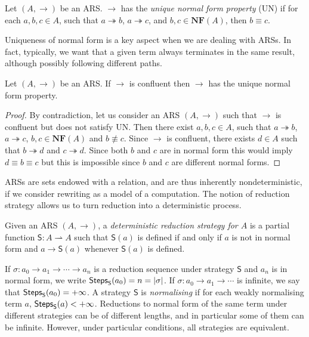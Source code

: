 \begin{definition}
	Let $(A,\rightarrow)$ be an ARS. $\rightarrow$ has the \emph{unique normal form property} (UN) if for each $a,b,c\in A$, such that $a\twoheadrightarrow b$, $a\twoheadrightarrow c$, and $b,c\in\mathbf{NF}(A)$, then $b\equiv c$.
\end{definition}
Uniqueness of normal form is a key aspect when we are dealing with ARSs. In fact, typically, we want that a given term always terminates in the same result, although possibly following different paths.
\begin{proposition}
	Let $(A,\rightarrow)$ be an ARS. If $\rightarrow$ is confluent then $\rightarrow$ has the unique normal form property.
\end{proposition}
\begin{proof}
	By contradiction, let us consider an ARS $(A,\rightarrow)$ such that $\rightarrow$ is confluent but does not satisfy UN. Then there exist $a,b,c\in A$, such that $a\twoheadrightarrow b$, $a\twoheadrightarrow c$, $b,c\in\mathbf{NF}(A)$ and $b\not\equiv c$. Since $\rightarrow$ is confluent, there exists $d\in A$ such that $b\twoheadrightarrow d$ and $c\twoheadrightarrow d$. Since both $b$ and $c$ are in normal form this would imply $d\equiv b\equiv c$ but this is impossible since $b$ and $c$ are different normal forms.
\end{proof}
ARSs are sets endowed with a relation, and are thus
inherently nondeterministic, if we consider rewriting as a model of a computation. The notion of reduction strategy allows us to turn reduction into a deterministic process.
\begin{definition}\label{def:determstrat}
	Given an ARS $(A,\rightarrow)$, a \emph{deterministic reduction
		strategy for $A$} is a partial function $\mathsf{S}:A\rightharpoonup A$
	such that $\mathsf{S}(a)$ is defined if and only if $a$ is not in
	normal form and $a\rightarrow\mathsf{S}(a)$ whenever $\mathsf{S}(a)$
	is defined.
\end{definition}
If $\sigma:a_0\rightarrow a_1\rightarrow\cdots\rightarrow a_n$ is a
reduction sequence under strategy $\mathsf{S}$ and $a_n$ is in normal
form, we write $\textsf{Steps}_{\mathsf{S}}(a_0)=n=|\sigma|$. If
$\sigma:a_0\rightarrow a_1\rightarrow\cdots$ is infinite, we say that
$\textsf{Steps}_{\mathsf{S}}(a_0)=+\infty$. A strategy $\mathsf{S}$ is \emph{normalising} if for each weakly normalising term $a$, $\textsf{Steps}_{\mathsf{S}}(a)<+\infty$. Reductions to normal form of the same term under different strategies can be of different lengths, and in particular some of them can be infinite. However, under particular conditions, all strategies are equivalent.
